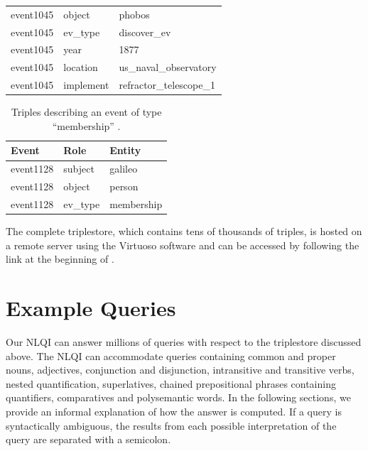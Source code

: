 \documentclass[../main.tex]{subfiles}
\begin{document}
\begin{refsection}
\begin{table}
\begin{tabular}{|l|l|l|}
		event1045 &
		object &
		phobos \\

		event1045 &
		ev\_type &
		discover\_ev \\

		event1045 &
		year &
		1877 \\

		event1045 &
		location &
		us\_naval\_observatory \\

		event1045 &
		implement &
		refractor\_telescope\_1 \\
		\hline
	\end{tabular}
\end{table}
\begin{table}
	\caption{Triples describing an event of type ``membership'' \cite{frostpeelar2019}.}
	\label{webist2019journal:evmember}
	\centering
	\begin{tabular}{|l|l|l|}
		\hline
		Event & Role & Entity \\
		\hline
		event1128 &
		subject &
		galileo \\

		event1128 &
		object &
		person \\

		event1128 &
		ev\_type &
		membership \\
		\hline
	\end{tabular}
\end{table}
The complete triplestore, which contains tens of thousands of triples, is hosted on a remote server using the Virtuoso software \cite{virtuoso} and can be accessed by following the link at the beginning of .

\section{Example Queries}
\label{webist2019journal:examples}

Our NLQI can answer millions of queries with respect to the triplestore discussed above. The NLQI can accommodate queries containing common and proper nouns, adjectives, conjunction and disjunction, intransitive and transitive verbs, nested quantification, superlatives, chained prepositional phrases containing quantifiers, comparatives and polysemantic words. In the following sections, we provide an informal explanation of how the answer is computed.  If a query is syntactically ambiguous, the results from each possible interpretation of the query are separated with a semicolon.


\end{refsection}
\end{document}
